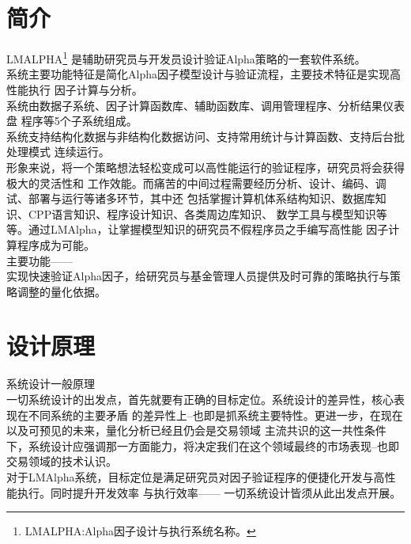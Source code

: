 
\chapter{简介}


\large{LMALPHA}\footnote{LMALPHA:Alpha因子设计与执行系统名称。}
\normalsize\phantom{L}
是辅助研究员与开发员设计验证Alpha策略的一套软件系统。\\

系统主要功能特征是简化Alpha因子模型设计与验证流程，主要技术特征是实现高性能执行
因子计算与分析。\\

系统由数据子系统、因子计算函数库、辅助函数库、调用管理程序、分析结果仪表盘
程序等5个子系统组成。\\

系统支持结构化数据与非结构化数据访问、支持常用统计与计算函数、支持后台批处理模式
连续运行。\\

形象来说，将一个策略想法轻松变成可以高性能运行的验证程序，研究员将会获得极大的灵活性和
工作效能。而痛苦的中间过程需要经历分析、设计、编码、调试、部署与运行等诸多环节，其中还
包括掌握计算机体系结构知识、数据库知识、CPP语言知识、程序设计知识、各类周边库知识、
数学工具与模型知识等等。通过LMAlpha，让掌握模型知识的研究员不假程序员之手编写高性能
因子计算程序成为可能。\\

\large{主要功能}\normalsize{}——\\

实现快速验证Alpha因子，给研究员与基金管理人员提供及时可靠的策略执行与策略调整的量化依据。


\chapter{设计原理}

\large{系统设计一般原理}\normalsize{}\\

一切系统设计的出发点，首先就要有正确的目标定位。系统设计的差异性，核心表现在不同系统的主要矛盾
的差异性上--也即是抓系统主要特性。更进一步，在现在以及可预见的未来，量化分析已经且仍会是交易领域
主流共识的这一共性条件下，系统设计应强调那一方面能力，将决定我们在这个领域最终的市场表现--也即
交易领域的技术认识。\\

对于LMAlpha系统，目标定位是满足研究员对因子验证程序的便捷化开发与高性能执行。同时提升开发效率
与执行效率—— 一切系统设计皆须从此出发点开展。\\

